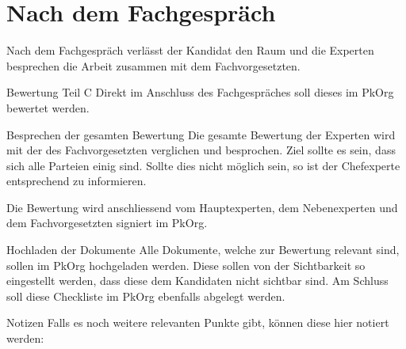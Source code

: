 \section{Nach dem Fachgespräch}
Nach dem Fachgespräch verlässt der Kandidat den Raum und die Experten besprechen die Arbeit zusammen mit dem Fachvorgesetzten.

\begin{taskitem}{Bewertung Teil C}
Direkt im Anschluss des Fachgespräches soll dieses im PkOrg bewertet werden.
\end{taskitem}

\begin{taskitem}{Besprechen der gesamten Bewertung}
Die gesamte Bewertung der Experten wird mit der des Fachvorgesetzten verglichen und besprochen. Ziel sollte es sein, dass sich alle
Parteien einig sind. Sollte dies nicht möglich sein, so ist der Chefexperte entsprechend zu informieren.

Die Bewertung wird anschliessend vom Hauptexperten, dem Nebenexperten und dem Fachvorgesetzten signiert im PkOrg.
\end{taskitem}

\begin{taskitemwithoutcomment}{Hochladen der Dokumente}
Alle Dokumente, welche zur Bewertung relevant sind, sollen im PkOrg hochgeladen werden. Diese sollen von der Sichtbarkeit so
eingestellt werden, dass diese dem Kandidaten nicht sichtbar sind. Am Schluss soll diese Checkliste im PkOrg ebenfalls abgelegt werden.
\end{taskitemwithoutcomment}

\begin{taskitem}{Notizen}
Falls es noch weitere relevanten Punkte gibt, können diese hier notiert werden:
\end{taskitem}
